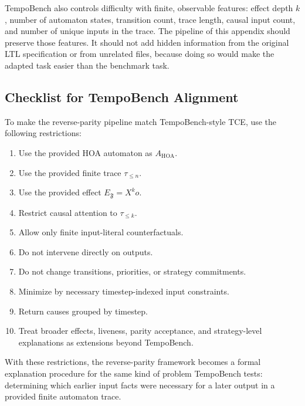 \documentclass[11pt]{article}
\theoremstyle{remark}
\newcommand{\Frame}{\mathfrak{F}}
\begin{document}
TempoBench also controls difficulty with finite, observable features: effect
depth \(k\), number of automaton states, transition count, trace length, causal
input count, and number of unique inputs in the trace. The pipeline of this
appendix should preserve those features. It should not add hidden information from the
original LTL specification or from unrelated files, because doing so would make
the adapted task easier than the benchmark task.

\subsection{Checklist for TempoBench Alignment}

To make the reverse-parity pipeline match TempoBench-style TCE, use the
following restrictions:
\begin{enumerate}[label=\arabic*.]
  \item Use the provided HOA automaton as \(A_{\mathrm{HOA}}\).
  \item Use the provided finite trace \(\tau_{\le n}\).
  \item Use the provided effect \(E_{\Frame}=X^k o\).
  \item Restrict causal attention to \(\tau_{\le k}\).
  \item Allow only finite input-literal counterfactuals.
  \item Do not intervene directly on outputs.
  \item Do not change transitions, priorities, or strategy commitments.
  \item Minimize by necessary timestep-indexed input constraints.
  \item Return causes grouped by timestep.
  \item Treat broader effects, liveness, parity acceptance, and strategy-level
        explanations as extensions beyond TempoBench.
\end{enumerate}

With these restrictions, the reverse-parity framework becomes a formal
explanation procedure for the same kind of problem TempoBench tests: determining
which earlier input facts were necessary for a later output in a provided finite
automaton trace.
\end{document}

